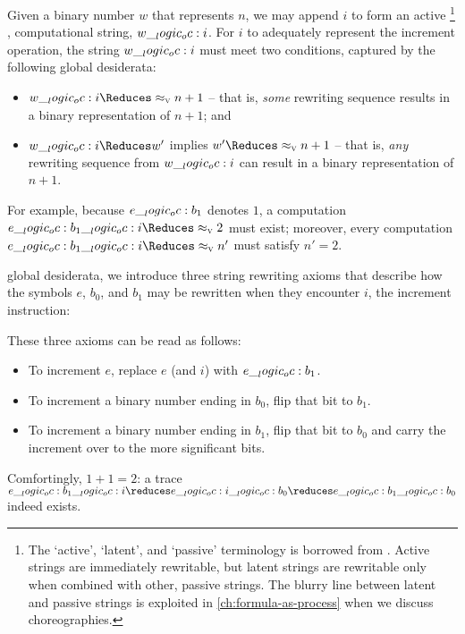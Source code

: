 Given a binary number $w$ that represents $n$, we may append $i$ to form an active%
\footnote{The \enquote*{active}, \enquote*{latent}, and \enquote*{passive} terminology is borrowed from \textcite{Pfenning+Simmons:LICS09}.
  Active strings are immediately rewritable, but latent strings are rewritable only when combined with other, passive strings.
  The blurry line between latent and passive strings is exploited in \cref{ch:formula-as-process} when we discuss choreographies.}%
, computational string, $w \__logic_oc: i$.
For $i$ to adequately represent the increment operation, the string $w \__logic_oc: i$ must meet two conditions, captured by the following global desiderata:
  \begin{itemize}%
  \item
    $w \oc i \Reduces\aval{}{n+1}$ -- that is, \emph{some} rewriting sequence results in a binary representation of $n+1$; and
  \item
    $w \oc i \Reduces w'$ implies $w' \Reduces\aval{}{n+1}$ -- that is, \emph{any} rewriting sequence from $w \__logic_oc: i$ can result in a binary representation of $n+1$.
  \end{itemize}
For example, because $e \__logic_oc: b_1$ denotes $1$, a computation $e \oc b_1 \oc i \Reduces\aval{}{2}$ must exist; moreover, every computation $e \oc b_1 \oc i \Reduces\aval{}{n'}$ must satisfy $n' = 2$.

 global desiderata, we introduce three string rewriting axioms that describe how the symbols $e$, $b_0$, and $b_1$ may be rewritten when they encounter $i$, the increment instruction:
These three axioms can be read as follows:
\begin{itemize}
\item
  To increment $e$, replace $e$ (and $i$) with $e \__logic_oc: b_1$.
\item
  To increment a binary number ending in $b_0$, flip that bit to $b_1$.
\item
  To increment a binary number ending in $b_1$, flip that bit to $b_0$ and carry the increment over to the more significant bits.
\end{itemize}
Comfortingly, $1+1 = 2$: a trace $e \oc b_1 \oc i \reduces e \oc i \oc b_0 \reduces e \oc b_1 \oc b_0$ indeed exists.

